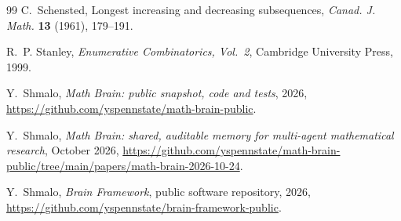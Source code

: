 \documentclass[11pt]{amsart}
\theoremstyle{remark}
\numberwithin{equation}{section}
\begin{document}
\begin{thebibliography}{99}
C.~Schensted, Longest increasing and decreasing subsequences, \emph{Canad. J. Math.} \textbf{13} (1961), 179--191.

R.~P. Stanley, \emph{Enumerative Combinatorics, Vol.~2}, Cambridge University Press, 1999.

 Y.~Shmalo, \emph{Math Brain: public snapshot, code and tests}, 2026, \url{https://github.com/yspennstate/math-brain-public}.

 Y.~Shmalo, \emph{Math Brain: shared, auditable memory for multi-agent mathematical research}, October 2026, \url{https://github.com/yspennstate/math-brain-public/tree/main/papers/math-brain-2026-10-24}.

 Y.~Shmalo, \emph{Brain Framework}, public software repository, 2026, \url{https://github.com/yspennstate/brain-framework-public}.

\end{thebibliography}
\end{document}
